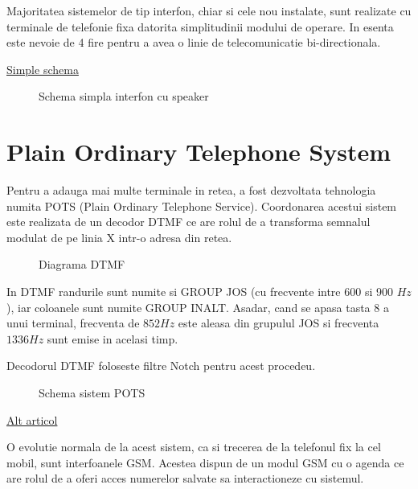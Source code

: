 Majoritatea sistemelor de tip interfon, chiar si cele nou instalate, sunt realizate cu terminale de telefonie fixa datorita simplitudinii modului de operare. In esenta este nevoie de 4 fire pentru a avea o linie de telecomunicatie bi-directionala.

\href{https://www.epanorama.net/documents/telecom/telephone_intercom.html}{Simple schema}

\begin{figure}[h!]
  \centering
  \caption{Schema simpla interfon cu speaker}
\end{figure}

\section {Plain Ordinary Telephone System}

Pentru a adauga mai multe terminale in retea, a fost dezvoltata tehnologia numita POTS (Plain Ordinary Telephone Service). Coordonarea acestui sistem este realizata de un decodor DTMF ce are rolul de a transforma semnalul modulat de pe linia X intr-o adresa din retea. 

\begin{figure}[h!]
  \centering
  \caption{Diagrama DTMF}
\end{figure}

In DTMF randurile sunt numite si GROUP JOS (cu frecvente intre 600 si 900 $Hz$), iar coloanele sunt numite GROUP INALT. Asadar, cand se apasa tasta 8 a unui terminal, frecventa de $852 Hz$ este aleasa din grupulul JOS si frecventa $1336 Hz$ sunt emise in acelasi timp.


Decodorul DTMF foloseste filtre Notch pentru acest procedeu.

\begin{figure}[h!]
  \centering
  \caption{Schema sistem POTS}
\end{figure}

\cite{WinNT}



\href{https://www.nextiva.com/blog/what-is-pots.html}{Alt articol}

O evolutie normala de la acest sistem, ca si trecerea de la telefonul fix la cel mobil, sunt interfoanele GSM. Acestea dispun de un modul GSM cu o agenda ce are rolul de a oferi acces numerelor salvate sa interactioneze cu sistemul.


